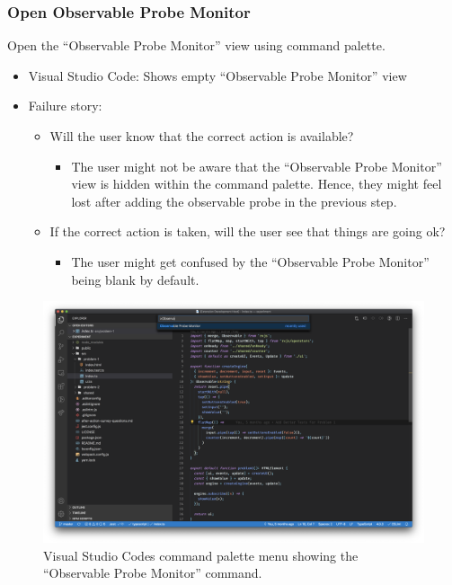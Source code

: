 \documentclass[sigplan,screen,nonacm,review]{acmart}
\begin{document}
\subsubsection{Open Observable Probe Monitor}
Open the ``Observable Probe Monitor'' view using command palette.

\begin{itemize}
	\item Visual Studio Code: Shows empty ``Observable Probe Monitor'' view
	\item Failure story:
	      \begin{itemize}
	      	\item Will the user know that the correct action is available?
	      	      \begin{itemize}
	      	      	\item The user might not be aware that the ``Observable Probe Monitor'' view is hidden within the command palette. Hence, they might feel lost after adding the observable probe in the previous step.
	      	      \end{itemize}
	      	\item If the correct action is taken, will the user see that things are going ok?
	      	      \begin{itemize}
	      	      	\item The user might get confused by the ``Observable Probe Monitor'' being blank by default.
	      	      \end{itemize}
	      \end{itemize}
\end{itemize}

\begin{figure}[ht]
	\centering
	\includegraphics[width=\columnwidth]{walkthrough-screenshots/step5-1.png}
	\Description{}
	\caption{Visual Studio Codes command palette menu showing the ``Observable Probe Monitor'' command.}
	\label{fig:walkthrough-screesnhot-step-5-1}
\end{figure}
\end{document}
